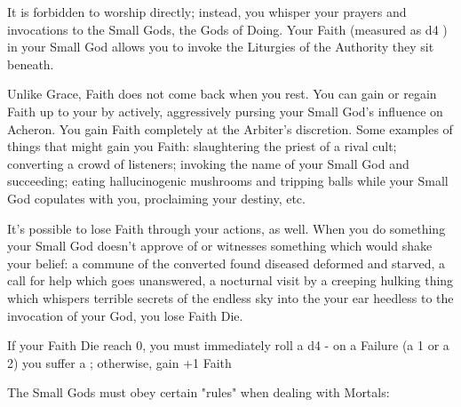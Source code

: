 {

It is forbidden to worship \TheAuthority directly; instead, you whisper your prayers and invocations to the Small Gods, the Gods of Doing.  Your Faith (measured as d4 \UD) in your Small God allows you to invoke the Liturgies of the Authority they sit beneath.

Unlike Grace, Faith does not come back when you rest.  You can gain or regain Faith up to your \MAX by actively, aggressively pursing your Small God's influence on Acheron.  You gain Faith \UD completely at the Arbiter's discretion.  Some examples of things that might gain you Faith: slaughtering the priest of a rival cult; converting a crowd of listeners; invoking the name of your Small God and succeeding; eating hallucinogenic mushrooms and tripping balls while your Small God copulates with you, proclaiming your destiny, etc.

It's possible to lose Faith through your actions, as well.  When you do something your Small God doesn't approve of or witnesses something which would shake your belief: a commune of the converted found diseased deformed and starved, a call for help which goes unanswered, a nocturnal visit by a creeping hulking thing which whispers terrible secrets of the endless sky into the your ear heedless to the invocation of your God, you lose Faith Die.

If your Faith Die reach 0, you must immediately roll a d4 - on a Failure (a 1 or a 2) you suffer a ; otherwise, gain +1 Faith \UD

\newpage


The Small Gods must obey certain "rules" when dealing with Mortals:


}
